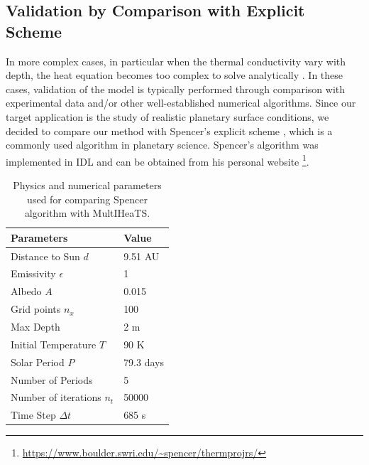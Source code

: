 \documentclass[sn-vancouver, Numbered]{sn-jnl}
\begin{document}
\subsection{Validation by Comparison with Explicit Scheme}

In more complex cases, in particular when the thermal conductivity vary with depth, the heat equation becomes too complex to solve analytically \cite{Jaeger1950}. 
In these cases, validation of the model is typically performed through comparison with experimental data and/or other well-established numerical algorithms.
Since our target application is the study of realistic planetary surface conditions, we decided to compare our method with Spencer's explicit scheme \cite{Spencer1989}, which is a commonly used algorithm in planetary science. 
Spencer's algorithm was implemented in IDL and can be obtained from his personal website \footnote{\url{https://www.boulder.swri.edu/~spencer/thermprojrs/}}.


\begin{table}[htbp]
    \centering
    \begin{tabular}{ll}
    \toprule
    Parameters & Value \\ 
    \midrule
    Distance to Sun $d$ &  9.51 AU  \\
    Emissivity $\epsilon$ &  1  \\
    Albedo $A$ & 0.015  \\
    Grid points $n_x$ & 100  \\
    Max Depth   & 2 m    \\
    Initial Temperature $T$ &  90 K  \\
    Solar Period $P$  & 79.3 days   \\
    Number of Periods & 5   \\
    Number of iterations $n_t$ &  50000   \\
    Time Step $\Delta t$ &  685 s   \\
    \bottomrule
    \end{tabular}
\caption{Physics and numerical parameters used for comparing Spencer algorithm with MultIHeaTS.}
\label{tab:params}
\end{table}
\end{document}
